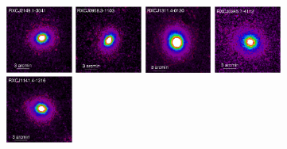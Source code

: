 \documentclass[oldversion]{aa}
\begin{document}
\begin{figure}[]

\includegraphics[scale=1.,angle=0,keepaspectratio,width=0.195\textwidth]{0944fa1a.ps}
\hfill
\includegraphics[scale=1.,angle=0,keepaspectratio,width=0.195\textwidth]{0944fa1b.ps}
\hfill
\includegraphics[scale=1.,angle=0,keepaspectratio,width=0.195\textwidth]{0944fa1c.ps}
\hfill
\includegraphics[scale=1.,angle=0,keepaspectratio,width=0.195\textwidth]{0944fa1d.ps}
\hfill
\includegraphics[scale=1.,angle=0,keepaspectratio,width=0.195\textwidth]{0944fa1e.ps}


\end{figure}
\end{document}
